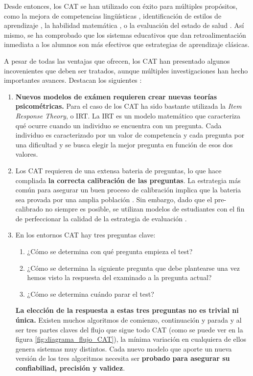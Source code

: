 Desde entonces, los \acrshort{CAT} se han utilizado con éxito para múltiples propósitos, como la mejora de competencias lingüísticas \cite{Chapelle06} , identificación de estilos de aprendizaje \cite{Ortigosa10}, la habilidad matemática \cite{Klinkenberg11}, o la evaluación del estado de salud \cite{Revicki97}. Así mismo, se ha comprobado que los sistemas educativos que dan retroalimentación inmediata a los alumnos son más efectivos que estrategias de aprendizaje clásicas\cite{Kumar04}. 

A pesar de todas las ventajas que ofrecen, los \acrshort{CAT} han presentado algunos incovenientes que deben ser tratados, aunque múltiples investigaciones han hecho importantes avances. Destacan los siguientes \cite{Wainer00}:

\begin{enumerate}
 	\item \textbf{Nuevos modelos de exámen requieren crear nuevas teorías psicométricas.} Para el caso de los \acrshort{CAT} ha sido bastante utilizada la \textit{Item Response Theory}, o \acrshort{IRT}. La \acrshort{IRT} es un modelo matemático que caracteriza qué ocurre cuando un individuo se encuentra con un pregunta. Cada individuo es caracterizado por un valor de competencia y cada pregunta por una dificultad y se busca elegir la mejor pregunta en función de esos dos valores\cite{Wainer83}.
	\item Los \acrshort{CAT} requieren de una extensa bateria de preguntas, lo que hace compliada \textbf{la correcta calibración de las preguntas}. La estrategia más común para asegurar un buen proceso de calibración implica que la bateria sea provada por una amplia población \cite{Klinkenberg11}. Sin embargo, dado que el pre-calibrado no siempre es posible, se utilizan modelos de estudiantes con el fin de perfeccionar la calidad de la estrategia de evaluación \cite{Antal11}\cite{Galvez09}\cite{Molins14Test}.
	\item En los entornos \acrshort{CAT} hay tres preguntas clave:
	\begin{enumerate}
		\item ¿Cómo se determina con qué pregunta empieza el test?
		\item ¿Cómo se determina la siguiente pregunta que debe plantearse una vez hemos visto la respuesta del examinado a la pregunta actual?
		\item ¿Cómo se determina cuándo parar el test?
	\end{enumerate}
	\textbf{La elección de la respuesta a estas tres preguntas no es trivial ni única.} Existen muchos algoritmos de comienzo, continuación y parada y al ser tres partes claves del flujo que sigue todo \acrshort{CAT} (como se puede ver en la figura \ref{fig:diagrama_flujo_CAT}), la mínima variación en cualquiera de ellos genera sistemas muy distintos. Cada nuevo modelo que aporte un nueva versión de los tres algoritmos necesita ser \textbf{probado para asegurar su confiabiliad, precisión y validez}\cite{Wainer00}.
\end{enumerate}

